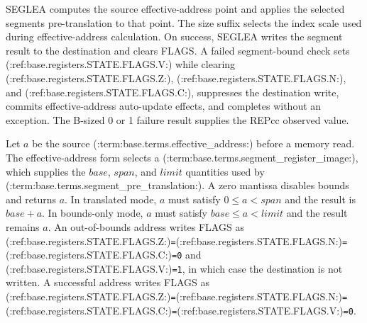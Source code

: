 SEGLEA computes the source effective-address point and applies the selected segment\textquotesingle{}s pre-translation to that point. The size suffix selects the index scale used during effective-address calculation. On success, SEGLEA writes the segment result to the destination and clears FLAGS. A failed segment-bound check sets (:ref:base.registers.STATE.FLAGS.V:) while clearing (:ref:base.registers.STATE.FLAGS.Z:), (:ref:base.registers.STATE.FLAGS.N:), and (:ref:base.registers.STATE.FLAGS.C:), suppresses the destination write, commits effective-address auto-update effects, and completes without an exception. The B-sized 0 or 1 failure result supplies the REPcc observed value.

Let \(a\) be the source (:term:base.terms.effective_address:) before a memory read. The
effective-address form selects a (:term:base.terms.segment_register_image:), which supplies the
\(\mathit{base}\), \(\mathit{span}\), and \(\mathit{limit}\) quantities used by
(:term:base.terms.segment_pre_translation:).
A zero mantissa disables bounds and returns \(a\). In translated mode, \(a\) must satisfy
\(0 \le a < \mathit{span}\) and the result is \(\mathit{base}+a\). In bounds-only mode, \(a\) must satisfy
\(\mathit{base} \le a < \mathit{limit}\) and the result remains \(a\). An out-of-bounds address writes FLAGS as
(:ref:base.registers.STATE.FLAGS.Z:)\texttt{=}(:ref:base.registers.STATE.FLAGS.N:)\texttt{=}(:ref:base.registers.STATE.FLAGS.C:)\texttt{=0} and (:ref:base.registers.STATE.FLAGS.V:)\texttt{=1}, in which case the destination is not written. A successful address writes FLAGS as (:ref:base.registers.STATE.FLAGS.Z:)\texttt{=}(:ref:base.registers.STATE.FLAGS.N:)\texttt{=}(:ref:base.registers.STATE.FLAGS.C:)\texttt{=}(:ref:base.registers.STATE.FLAGS.V:)\texttt{=0}.

